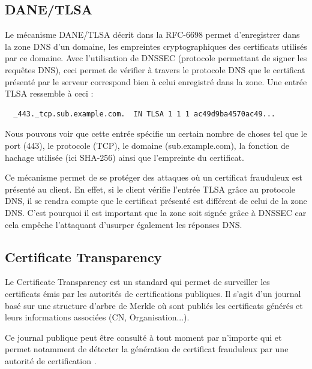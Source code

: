 \subsection{DANE/TLSA}

Le mécanisme DANE/TLSA décrit dans la RFC-6698 permet d'enregistrer dans la zone DNS d'un domaine, les empreintes cryptographiques des certificats utilisés par ce domaine. Avec l'utilisation de DNSSEC (protocole permettant de signer les requêtes DNS), ceci permet de vérifier à travers le protocole DNS que le certificat présenté par le serveur correspond bien à celui enregistré dans la zone. Une entrée TLSA ressemble à ceci :

\begin{verbatim}
  _443._tcp.sub.example.com.  IN TLSA 1 1 1 ac49d9ba4570ac49...
\end{verbatim}

Nous pouvons voir que cette entrée spécifie un certain nombre de choses tel que le port (443), le protocole (TCP), le domaine (sub.example.com), la fonction de hachage utilisée (ici SHA-256) ainsi que l'empreinte du certificat.

Ce mécanisme permet de se protéger des attaques où un certificat frauduleux est présenté au client. En effet, si le client vérifie l'entrée TLSA grâce au protocole DNS, il se rendra compte que le certificat présenté est différent de celui de la zone DNS. C'est pourquoi il est important que la zone soit signée grâce à DNSSEC car cela empêche l'attaquant d'usurper également les réponses DNS.

\subsection{Certificate Transparency}

Le Certificate Transparency est un standard qui permet de surveiller les certificats émis par les autorités de certifications publiques. Il s'agit d'un journal basé sur une structure d'arbre de Merkle où sont publiés les certificats générés et leurs informations associées (CN, Organisation...).

Ce journal publique peut être consulté à tout moment par n'importe qui et permet notamment de détecter la génération de certificat frauduleux par une autorité de certification \cite{certificate-transparency}.
